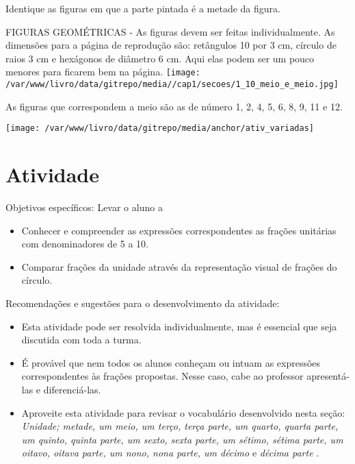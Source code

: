 \documentclass[a4paper,12pt,twoside]{book}
\begin{document}
Identique as figuras em que a parte pintada é a metade da figura.
\begin{imagem*}[breakable]{}{}    FIGURAS GEOMÉTRICAS - As figuras devem ser feitas individualmente. As dimensões para a página de reprodução são: retângulos 10 por 3 cm, círculo de raios 3 cm e hexágonos de diâmetro 6 cm. Aqui elas podem ser um pouco menores para ficarem bem na página.  
    \texttt{[image: /var/www/livro/data/gitrepo/media//cap1/secoes/1\_10\_meio\_e\_meio.jpg]}  
\end{imagem*}


\begin{resposta*}[breakable]{}{}  
  As figuras que correspondem a meio são as de número 1, 2, 4, 5, 6, 8, 9, 11 e 12.  
\end{resposta*}







\texttt{[image: /var/www/livro/data/gitrepo/media/anchor/ativ\_variadas]}
\section{Atividade}




\begin{professor*}[breakable]{}{}     
  Objetivos específicos: Levar o aluno a   
\begin{itemize} %
    \item       Conhecer e compreender as expressões correspondentes as frações unitárias com denominadores de 5 a 10.
    \item       Comparar frações da unidade através da representação visual de frações do círculo.
\end{itemize} %
  
      
  Recomendações e sugestões para o desenvolvimento da atividade:  
\begin{itemize} %
    \item       Esta atividade pode ser resolvida individualmente, mas é essencial que seja discutida com toda a turma.  
    \item       É provável que nem todos os alunos conheçam ou intuam as expressões correspondentes às frações propostas. Nesse caso, cabe ao professor apresentá-las e diferenciá-las.
    \item       Aproveite esta atividade para revisar o vocabulário desenvolvido nesta seção:       {\it Unidade; metade, um meio, um terço, terça parte, um quarto, quarta parte, um quinto, quinta parte, um sexto, sexta parte, um sétimo, sétima parte, um oitavo, oitava parte, um nono, nona parte, um décimo}       e       {\it décima parte}      .
\end{itemize} %
  
  
\end{professor*}
\end{document}

